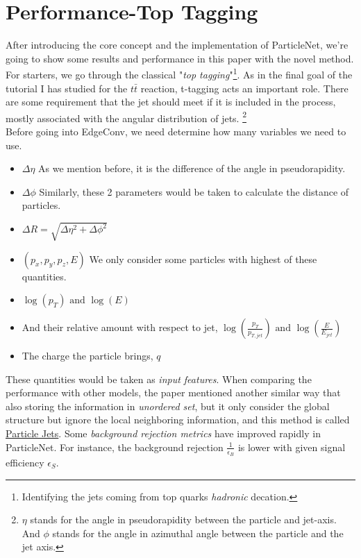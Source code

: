 \documentclass[12pt]{article}
\numberwithin{equation}{section}
\begin{document}
\section{Performance-Top Tagging}

After introducing the core concept and the implementation of ParticleNet, we're going to show some results and performance in this paper with the novel method. For starters, we go through the classical "\textit{top tagging}"\footnote{Identifying the jets coming from top quarks \textit{hadronic} decation.}. As in the final goal of the tutorial I has studied for the $t\bar{t}$ reaction, t-tagging acts an important role.
There are some requirement that the jet should meet if it is included in the process, mostly associated with the angular distribution of jets.
\footnote{$\eta$ stands for the angle in pseudorapidity between the particle and jet-axis. And $\phi$ stands for the angle in azimuthal angle between the particle and the jet axis.}
\\\indent
Before going into EdgeConv, we need determine how many variables we need to use. 

\begin{itemize}
    \item $\Delta \eta$ As we mention before, it is the difference of the angle in pseudorapidity.
    \item $\Delta \phi$ Similarly, these 2 parameters would be taken to calculate the distance of particles.
    \item $\Delta R = \sqrt{\Delta \eta ^2 + \Delta \phi ^2}$
    \item $\left(p_x, p_y, p_z, E\right)$ We only consider some particles with highest of these quantities. 
    \item $\log(p_T) \text{ and } \log(E)$
    \item And their relative amount with respect to jet, $\log(\frac{p_T}{p_{T, jet}})\text{ and }\log(\frac{E}{E_{jet}})$
    \item The charge the particle brings, $q$
\end{itemize}

These quantities would be taken as \textit{input features}. When comparing the performance with other models, the paper mentioned another similar way that also storing the information in \textit{unordered set}, but it only consider the global structure but ignore the local neighboring information, and this method is called \href{https://arxiv.org/abs/1810.05165}{Particle Jets}. Some \textit{background rejection metrics} have improved rapidly in ParticleNet. For instance, the background rejection $\frac{1}{\epsilon_{B}}$ is lower with given signal efficiency $\epsilon_{S}$.
\end{document}
